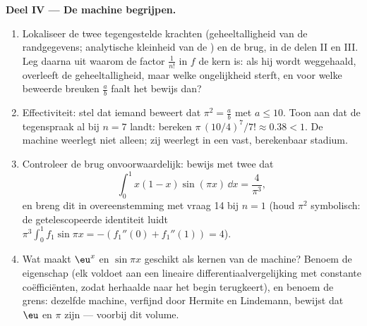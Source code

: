 \begin{problem}
\medskip
\noindent\textbf{Deel IV --- De machine begrijpen.}
\begin{enumerate}[resume]
  \item Lokaliseer de twee tegengestelde krachten (geheeltalligheid
        van de randgegevens; analytische kleinheid van de
        ) en de brug, in de delen II en III. Leg daarna
        uit waarom de factor $\frac{1}{n!}$ in $f$ de kern is: als
        hij wordt weggehaald, overleeft de geheeltalligheid, maar
        welke ongelijkheid sterft, en voor welke beweerde breuken
        $\frac ab$ faalt het bewijs dan?
  \item Effectiviteit: stel dat iemand beweert dat $\pi^2 = \frac
        ab$ met $a \leq 10$. Toon aan dat de tegenspraak al bij $n
        = 7$ landt: bereken $\pi\,(10/4)^7/7! \approx 0.38 < 1$. De
        machine weerlegt niet alleen; zij weerlegt in een vast,
        berekenbaar stadium.
  \item Controleer de brug onvoorwaardelijk: bewijs met twee
         dat
        \[
        \int_0^1 x(1 - x)\sin(\pi x)\,\dd x = \frac{4}{\pi^3},
        \]
        en breng dit in overeenstemming met vraag 14 bij $n = 1$
        (houd $\pi^2$ symbolisch: de getelescopeerde identiteit
        luidt $\pi^3 \int_0^1 f_1 \sin \pi x = -(f_1''(0) +
        f_1''(1)) = 4$).
  \item Wat maakt $\eu^x$ en $\sin \pi x$ geschikt als kernen van
        de machine? Benoem de eigenschap (elk voldoet aan een
        lineaire differentiaalvergelijking met constante
        coëfficiënten, zodat herhaalde  naar het
        begin terugkeert), en benoem de grens: dezelfde machine,
        verfijnd door Hermite en Lindemann, bewijst dat $\eu$ en
        $\pi$ \emph{} zijn --- voorbij dit volume.
\end{enumerate}


\end{problem}
